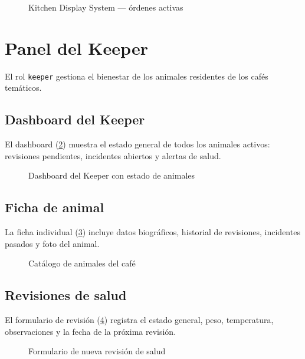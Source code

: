 \documentclass[12pt,a4paper,twoside,openright]{report}
\begin{document}
\begin{figure}[H]
  \centering
  \fbox{\rule{0pt}{6cm}\rule{12cm}{0pt}}
  \caption{Kitchen Display System — órdenes activas}
  \label{fig:56-kitchen-orders}
\end{figure}

\section{Panel del Keeper}
\label{sec:manual-keeper}

El rol \texttt{keeper} gestiona el bienestar de los animales residentes de los cafés
temáticos.

\subsection{Dashboard del Keeper}
El dashboard (\cref{fig:58-keeper-dashboard}) muestra el estado general de todos
los animales activos: revisiones pendientes, incidentes abiertos y alertas de salud.

\begin{figure}[H]
  \centering
  \fbox{\rule{0pt}{6cm}\rule{12cm}{0pt}}
  \caption{Dashboard del Keeper con estado de animales}
  \label{fig:58-keeper-dashboard}
\end{figure}

\subsection{Ficha de animal}
La ficha individual (\cref{fig:59-keeper-animals}) incluye datos biográficos,
historial de revisiones, incidentes pasados y foto del animal.

\begin{figure}[H]
  \centering
  \fbox{\rule{0pt}{6cm}\rule{12cm}{0pt}}
  \caption{Catálogo de animales del café}
  \label{fig:59-keeper-animals}
\end{figure}

\subsection{Revisiones de salud}
El formulario de revisión (\cref{fig:61-keeper-health-check-crear}) registra el
estado general, peso, temperatura, observaciones y la fecha de la próxima revisión.

\begin{figure}[H]
  \centering
  \fbox{\rule{0pt}{6cm}\rule{12cm}{0pt}}
  \caption{Formulario de nueva revisión de salud}
  \label{fig:61-keeper-health-check-crear}
\end{figure}
\end{document}
